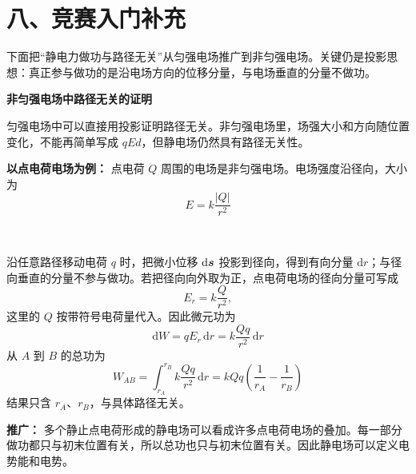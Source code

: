 \section*{八、竞赛入门补充}

下面把“静电力做功与路径无关”从匀强电场推广到非匀强电场。关键仍是投影思想：真正参与做功的是沿电场方向的位移分量，与电场垂直的分量不做功。

\begin{competitionbox}
\textbf{非匀强电场中路径无关的证明}

匀强电场中可以直接用投影证明路径无关。非匀强电场里，场强大小和方向随位置变化，不能再简单写成 $qE d$，但静电场仍然具有路径无关性。

\textbf{以点电荷电场为例：} 点电荷 $Q$ 周围的电场是非匀强电场。电场强度沿径向，大小为
\[
E=k\frac{|Q|}{r^2}
\]

\begin{center}
\\[0.3em]
\label{fig:nonuniform-field-path-proof}
\end{center}

沿任意路径移动电荷 $q$ 时，把微小位移 $\mathrm d\boldsymbol{s}$ 投影到径向，得到有向分量 $\mathrm dr$；与径向垂直的分量不参与做功。若把径向向外取为正，点电荷电场的径向分量可写成
\[
E_r=k\frac{Q}{r^2},
\]
这里的 $Q$ 按带符号电荷量代入。因此微元功为
\[
\mathrm{d}W=qE_r\,\mathrm{d}r=k\frac{Qq}{r^2}\,\mathrm{d}r
\]
从 $A$ 到 $B$ 的总功为
\[
W_{AB}=\int_{r_A}^{r_B} k\frac{Qq}{r^2}\,\mathrm{d}r
=kQq\left(\frac{1}{r_A}-\frac{1}{r_B}\right)
\]
结果只含 $r_A$、$r_B$，与具体路径无关。

\textbf{推广：} 多个静止点电荷形成的静电场可以看成许多点电荷电场的叠加。每一部分做功都只与初末位置有关，所以总功也只与初末位置有关。因此静电场可以定义电势能和电势。
\end{competitionbox}

